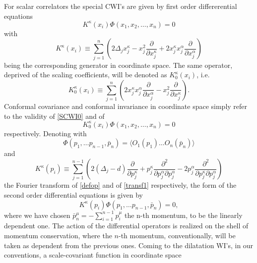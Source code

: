 \documentclass[a4paper,11pt,openright,twoside]{book}
\numberwithin{equation}{section}
\begin{document}
{For scalar correlators the special CWI's are given by first order differerential equations 
\begin{equation}
	\label{SCWI0}
	K^\kappa(x_i) \Phi(x_1,x_2,\ldots,x_n) =0
\end{equation}
with 
\begin{equation}
	\label{transf1}
	K^\kappa(x_i) \equiv \sum_{j=1}^{n} \left(2 \Delta_j x_j^\kappa- x_j^2\frac{\partial}{\partial x_j^\kappa}+ 2 x_j^\kappa x_j^\alpha \frac{\partial}
	{\partial x_j^\alpha} \right)
\end{equation}
being the corresponding generator in coordinate space. The same operator, deprived of the scaling coefficients, will be denoted as $K_0^\kappa(x_i)$, i.e. 
\begin{equation}
	K_0^\kappa(x_i) \equiv \sum_{j=1}^{n} \left(2 x_j^\kappa x_j^\alpha \frac{\partial}
	{\partial x_j^\alpha} - x_j^2\frac{\partial}{\partial x_j^\kappa}\right).
\end{equation}
Conformal covariance and conformal invariance in coordinate space simply refer to the validity of \eqref{SCWI0} and of
\begin{equation}
	K_0^\kappa(x_i) \Phi(x_1,x_2,\ldots,x_n) =0
\end{equation}
respectively. Denoting with 
\begin{equation}
	\Phi(p_1,\ldots p_{n-1},\bar{p}_n)=\langle O_1(p_1)\ldots O_n(\bar{p}_n)\rangle 
\end{equation}
and 
\begin{equation}
	K^\kappa(p_i)\equiv\sum_{j=1}^{n-1}\left(2(\Delta_j- d)\frac{\partial}{\partial p_j^\kappa}+p_j^\kappa \frac{\partial^2}{\partial p_j^\alpha\partial p_j^\alpha} -2 p_j^\alpha\frac{\partial^2}{\partial p_j^\kappa \partial p_j^\alpha}\right)
\end{equation}
the Fourier transform of \eqref{defop} and of \eqref{transf1} respectively, the form of the second order differential equations is given by
\begin{equation}
	K^\kappa(p_i)\Phi(p_1,\ldots p_{n-1},\bar{p}_n)=0,\label{SCWI}
\end{equation}
where we have chosen $\bar{p}_n^\mu=-\sum_{i=1}^{n-1} p_i^\mu$ the n-th momentum, to be the linearly dependent one.
The action of the differential operators is realized on the shell of momentum conservation, where the $n$-th momentum, conventionally, will be taken as dependent from the previous ones. Coming to the dilatation WI's, in our conventions, a scale-covariant 
function in coordinate space 
\begin{equation}

\end{equation}}
\end{document}
